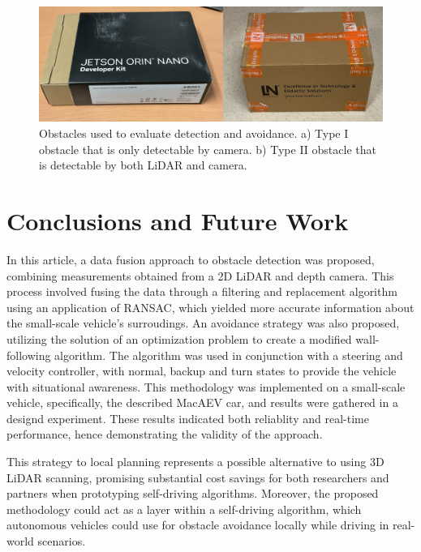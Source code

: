 \documentclass[conference]{IEEEtran}
\begin{document}
\begin{figure}
    \centering
    \includegraphics[scale=0.2]{paper_obstacle_image.png}
    \caption{Obstacles used to evaluate detection and avoidance. a) Type I obstacle that is only detectable by camera. b) Type II obstacle that is detectable by both LiDAR and camera.}
    \label{Figure 10}
\end{figure}




\section{Conclusions and Future Work}
In this article, a data fusion approach to obstacle detection was proposed, combining measurements obtained from a 2D LiDAR and depth camera. This process involved fusing the data through a filtering and replacement algorithm using an application of RANSAC, which yielded more accurate information about the small-scale vehicle's surroudings. An avoidance strategy was also proposed, utilizing the solution of an optimization problem to create a modified wall-following algorithm. The algorithm was used in conjunction with  a steering and velocity controller, with normal, backup and turn states to provide the vehicle with situational awareness. This methodology was implemented on a small-scale vehicle, specifically, the described MacAEV car, and results were gathered in a designd experiment. These results indicated both reliablity and real-time performance, hence demonstrating the validity of the approach. 





This strategy to local planning represents a possible alternative to using 3D LiDAR scanning, promising substantial cost savings for both researchers and partners when prototyping self-driving algorithms. Moreover, the proposed methodology could act as a layer within a self-driving algorithm, which autonomous vehicles could use for obstacle avoidance locally while driving in real-world scenarios. 
\end{document}
